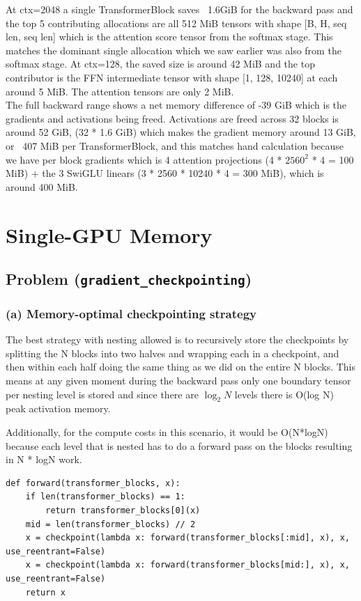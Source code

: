 \documentclass[11pt]{article}
\begin{document}
\newpage

At ctx=2048 a single TransformerBlock saves ~1.6GiB for the backward pass and the top 5 contributing allocations are all 512 MiB tensors with shape [B, H, seq len, seq len]
which is the attention score tensor from the softmax stage. This matches the dominant single allocation which we saw earlier was also from the softmax stage. At ctx=128, the saved size is
around 42 MiB and the top contributor is the FFN intermediate tensor with shape [1, 128, 10240] at each around 5 MiB. The attention tensors are only 2 MiB.
\\
The full backward range shows a net memory difference of -39 GiB which is the gradients and activations being freed. Activations are freed across 32 blocks is around 52 GiB, (32 * 1.6 GiB) which makes the 
gradient memory around 13 GiB, or ~407 MiB per TransformerBlock, and this matches hand calculation because we have per block gradients which is 4 attention projections (4 * $2560^2$ * 4 = 100 MiB) + the 3 SwiGLU linears (3 * 2560 * 10240 * 4 = 300 MiB),
which is around 400 MiB.
\section{Single-GPU Memory}


\subsection{Problem (\texttt{gradient\_checkpointing})}

\subsubsection*{(a) Memory-optimal checkpointing strategy}

The best strategy with nesting allowed is to recursively store the checkpoints by splitting the N blocks into two halves and wrapping each
in a checkpoint, and then within each half doing the same thing as we did on the entire N blocks. This means at any given moment during the backward
pass only one boundary tensor per nesting level is stored and since there are $\log_2{N}$ levels there is O(log N) peak activation memory.

Additionally, for the compute costs in this scenario, it would be O(N*logN) because each level that is nested has to do a forward pass on the blocks
resulting in N * logN work.

\begin{verbatim}
def forward(transformer_blocks, x):
    if len(transformer_blocks) == 1:
        return transformer_blocks[0](x)
    mid = len(transformer_blocks) // 2
    x = checkpoint(lambda x: forward(transformer_blocks[:mid], x), x, use_reentrant=False)
    x = checkpoint(lambda x: forward(transformer_blocks[mid:], x), x, use_reentrant=False)
    return x
\end{verbatim}
\end{document}
